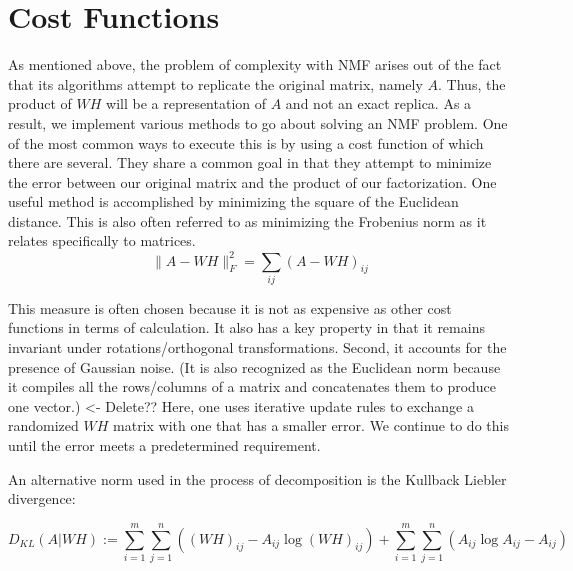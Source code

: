 \documentclass[
10pt, %
a4paper, %
oneside, %
headinclude,footinclude, %
BCOR5mm, %
]{scrartcl}
\begin{document}
\section{Cost Functions}
As mentioned above, the problem of complexity with NMF arises out of the fact that its algorithms attempt to replicate the original matrix, namely $A$.
Thus, the product of $WH$ will be a representation of $A$ and not an exact replica.
As a result, we implement various methods to go about solving an NMF problem.
One of the most common ways to execute this is by using a cost function of which there are several.
They share a common goal in that they attempt to minimize the error between our original matrix and the product of our factorization.
One useful method is accomplished by minimizing the square of the Euclidean distance.
This is also often referred to as minimizing the Frobenius norm as it relates specifically to matrices.
$$\lVert A-WH\rVert^{2}_{F}=\sum_{ij}(A-WH)_{ij}$$

This measure is often chosen because it is not as expensive as other cost functions in terms of calculation.
It also has a key property in that it remains invariant under rotations/orthogonal transformations.
Second, it accounts for the presence of Gaussian noise.
(It is also recognized as the Euclidean norm because it compiles all the rows/columns of a matrix and concatenates them to produce one vector.) <- Delete??
Here, one uses iterative update rules to exchange a randomized $WH$ matrix with one that has a smaller error.
We continue to do this until the error meets a predetermined requirement.

An alternative norm used in the process of decomposition is the Kullback Liebler divergence:

$$D_{KL}(A\vert WH):=\sum_{i=1}^{m}\sum_{j=1}^{n}((WH)_{ij}-A_{ij}\log(WH)_{ij})+\sum_{i=1}^{m}\sum_{j=1}^{n}(A_{ij}\log A_{ij}-A_{ij})$$


\end{document}
